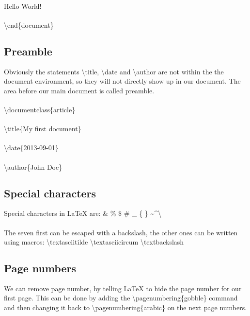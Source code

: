 \documentclass{article}
\begin{document}
\paragraph{}
  Hello World!
\paragraph{}
\textbackslash end\{document\}



\subsection{Preamble}
Obviously the statements \textbackslash title, \textbackslash date and  \textbackslash author are not within the the document environment, so they will not directly show up in our document. The area before our main document is called preamble.

\paragraph{}
\textbackslash documentclass\{article\}
\paragraph{}
\textbackslash title\{My first document\}
\paragraph{}
\textbackslash date\{2013-09-01\}
\paragraph{}
\textbackslash author\{John Doe\}

\subsection{Special characters}
Special characters in LaTeX are: \& \% \$ \# \_ \{ \} \textasciitilde \textasciicircum \textbackslash

\paragraph{}
The seven first can be escaped with a backslash, the other ones can be written using macros: \textbackslash textasciitilde \textbackslash textasciicircum \textbackslash textbackslash

\subsection{Page numbers}
We can remove page number, by telling LaTeX to hide the page number for our first page. This can be done by adding the \textbackslash pagenumbering\{gobble\} command and then changing it back to \textbackslash pagenumbering\{arabic\} on the next page numbers.
\end{document}

